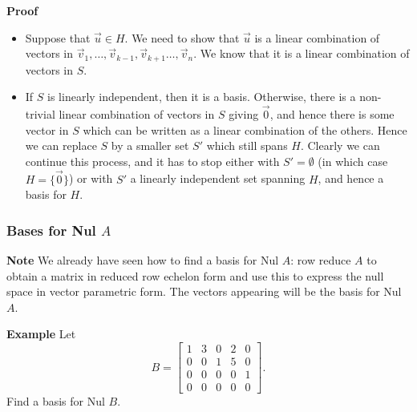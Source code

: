  \begin{frame}[fragile]
\textbf{Proof}
\begin{itemize}
\item Suppose that $\vec{u} \in H$.  We need to show that $\vec{u}$ is a 
linear combination of vectors in $\vec{v}_1, \dots, \vec{v}_{k-1},
\vec{v}_{k+1} \dots, \vec{v}_n$.  We know that it is a linear combination
of vectors in $S$.

\item If $S$ is linearly independent, then it is a basis.  Otherwise, there is a non-trivial 
linear combination of vectors in $S$ giving $\vec{0}$, and hence there is some vector
in $S$ which can be written as a linear combination of the others.  Hence we can replace
$S$ by a smaller set $S'$ which still spans $H$.  Clearly we can continue this process, and it 
has  to stop either with $S' =\emptyset$ (in which case $H = \{ \vec{0}\}$) or with 
$S'$ a linearly independent set spanning $H$, and hence a basis for $H$.
\end{itemize}

\end{frame}






 \begin{frame}[fragile]\frametitle{Bases for Nul $A$}

\textbf{Note}
We already have seen how to find a basis for Nul $A$: row reduce $A$ to obtain a matrix
in reduced row echelon form and use this to express the null space in vector parametric form.
The vectors appearing will be the basis for Nul $A$.



\textbf{Example}
 Let 
\[
B = \left[\begin{array}{rrrrrrrr} 
1 & 3 & 0 & 2 & 0  \\
0 & 0 & 1 & 5 & 0  \\
0 & 0 & 0 & 0 & 1 \\
0 & 0 & 0 & 0 & 0 
\end{array}\right].
\]
Find a basis for Nul $B$.

\end{frame}








